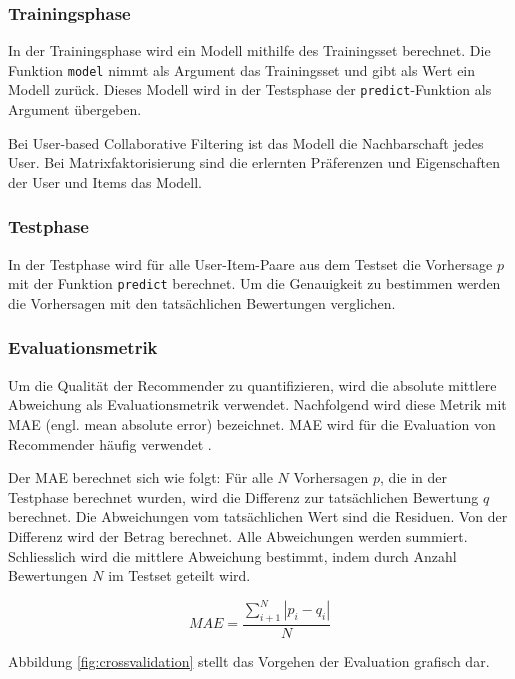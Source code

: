 \documentclass[a4paper, 12pt]{article}
\begin{document}
\subsubsection{Trainingsphase}

In der Trainingsphase wird ein Modell mithilfe des Trainingsset berechnet. Die Funktion \verb|model| nimmt als Argument das Trainingsset und gibt als Wert ein Modell zurück. Dieses Modell wird in der Testsphase der \verb|predict|-Funktion als Argument übergeben. 

Bei User-based Collaborative Filtering ist das Modell die Nachbarschaft jedes User. Bei Matrixfaktorisierung sind die erlernten Präferenzen und Eigenschaften der User und Items das Modell.

\subsubsection{Testphase}
In der Testphase wird für alle User-Item-Paare aus dem Testset die Vorhersage $p$ mit der Funktion \verb|predict| berechnet. Um die Genauigkeit zu bestimmen werden die Vorhersagen mit den tatsächlichen Bewertungen verglichen. 

\subsubsection{Evaluationsmetrik}
\label{sec:evaluationmetrik}

Um die Qualität der Recommender zu quantifizieren, wird die absolute mittlere Abweichung als Evaluationsmetrik verwendet. Nachfolgend wird diese Metrik mit MAE (engl. mean absolute error) bezeichnet. MAE wird für die Evaluation von Recommender häufig verwendet \cite{sarwar01}. 

Der MAE berechnet sich wie folgt: Für alle $N$ Vorhersagen $p$, die in der Testphase berechnet wurden, wird die Differenz zur tatsächlichen Bewertung $q$ berechnet. Die Abweichungen vom tatsächlichen Wert sind die Residuen. Von der Differenz wird der Betrag berechnet. Alle Abweichungen werden summiert. Schliesslich wird die mittlere Abweichung bestimmt, indem durch Anzahl Bewertungen $N$ im Testset geteilt wird. 

\begin{equation}
  \label{eq:mae}
  MAE = \frac{\sum_{i+1}^N | p_i-q_i | }{N}
\end{equation}

Abbildung \ref{fig:crossvalidation} stellt das Vorgehen der Evaluation grafisch dar.
\end{document}
